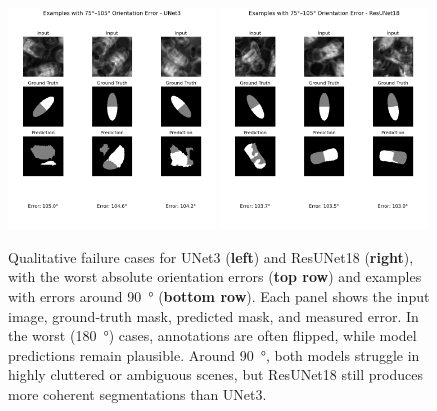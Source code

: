 \begin{figure}[htbp]
    \includegraphics[width=0.49\textwidth]{figures/results/5 - fails/UNet3 Orientation Errors 90deg Range.png}
    \hfill
    \includegraphics[width=0.49\textwidth]{figures/results/5 - fails/ResUNet18 Orientation Errors 90deg Range.png}
    \caption{
        Qualitative failure cases for UNet3 (\textbf{left}) and ResUNet18 (\textbf{right}), with the worst absolute orientation errors (\textbf{top row}) and examples with errors around \qty{90}{\degree} (\textbf{bottom row}).
        Each panel shows the input image, ground‑truth mask, predicted mask, and measured error.
        In the worst (\qty{180}{\degree}) cases, annotations are often flipped, while model predictions remain plausible.
        Around \qty{90}{\degree}, both models struggle in highly cluttered or ambiguous scenes, but ResUNet18 still produces more coherent segmentations than UNet3.
    }
    \label{fig:failure_modes}
\end{figure}